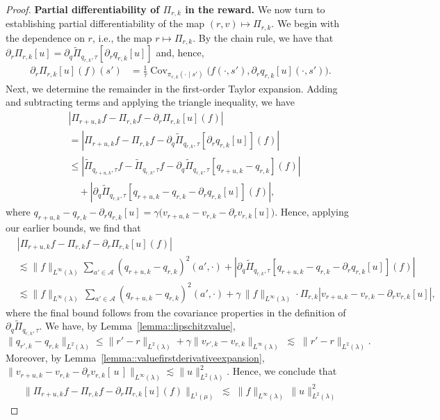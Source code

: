 \documentclass[11pt]{article}
\theoremstyle{plain}
\begin{document}
\begin{proof}
\noindent \textbf{Partial differentiability of $\Pi_{r,k}$ in the reward.} We now turn to establishing partial differentiability of the map $(r,v) \mapsto \Pi_{r,k}$. We begin with the dependence on $r$, i.e., the map $r \mapsto \Pi_{r,k}$. By the chain rule, we have that $\partial_r \Pi_{r, k}[u] =  \partial_q \widetilde{\Pi}_{q_{r,k},\tau}[\partial_r q_{r,k}[u]]$ and, hence,
\begin{align*}
    \partial_r \Pi_{r, k}[u](f)(s') &=  \frac{1}{\tau}\operatorname{Cov}_{\pi_{r, k}(\cdot \mid s')}\big(f(\cdot, s'), \partial_r q_{r,k}[u](\cdot, s')\big) .
\end{align*} 
Next, we determine the remainder in the first-order Taylor expansion. Adding and subtracting terms and applying the triangle inequality, we have 
\begin{align*}
&\left| \Pi_{r + u, k} f - \Pi_{r, k} f - \partial_r \Pi_{r, k}[u](f) \right| \\
&= \left| \Pi_{r + u, k} f - \Pi_{r, k} f - \partial_q \widetilde{\Pi}_{q_{r,k},\tau}[\partial_r q_{r,k}[u]](f) \right| \\
&\leq \left| \widetilde{\Pi}_{q_{r + u, k},\tau} f - \widetilde{\Pi}_{q_{r,k},\tau} f - \partial_q \widetilde{\Pi}_{q_{r,k},\tau}[q_{r + u, k} - q_{r,k}] (f)\right| \\
&\quad + \left| \partial_q \widetilde{\Pi}_{q_{r,k},\tau}[q_{r + u, k} - q_{r,k} - \partial_r q_{r,k}[u]](f) \right|,
\end{align*}
where  $q_{r + u, k} - q_{r,k} - \partial_r q_{r,k}[u] 
= \gamma \big(v_{r + u, k} - v_{r,k} - \partial_r v_{r,k}[u]\big).$
Hence, applying our earlier bounds, we find that 
\begin{align*}
&\left| \Pi_{r + u, k} f - \Pi_{r, k} f - \partial_r \Pi_{r, k}[u](f) \right| \\
&\lesssim \|f\|_{L^\infty(\lambda)}  \sum_{a' \in \mathcal{A}} (q_{r + u, k} - q_{r,k})^2(a' , \cdot)
   + \left| \partial_q \widetilde{\Pi}_{q_{r,k},\tau}[q_{r + u, k} - q_{r,k} - \partial_r q_{r,k}[u]](f) \right| \\
&\lesssim \|f\|_{L^\infty(\lambda)} \,\sum_{a' \in \mathcal{A}} (q_{r + u, k} - q_{r,k})^2(a' , \cdot) 
   + \gamma\,\|f\|_{L^\infty(\lambda)} \cdot \Pi_{r,k}\left|v_{r + u, k} - v_{r,k} - \partial_r v_{r,k}[u] \right| ,
\end{align*}
where the final bound follows from the covariance properties in the definition of $\partial_q \widetilde{\Pi}_{q_{r,k},\tau}$. We have, by Lemma~\ref{lemma::lipschitzvalue}, 
\[
\|q_{r',k} - q_{r,k}\|_{L^2(\lambda)}  \leq   \|r' - r\|_{L^2(\lambda)}+ \gamma \|v_{r',k} - v_{r,k}\|_{L^\infty(\lambda)} \;\lesssim\; \|r' - r\|_{L^2(\lambda)}.
\]
Moreover, by Lemma~\ref{lemma::valuefirstderivativeexpansion},  $\big\|v_{r + u,k} - v_{r,k} - \partial_r v_{r,k}[\,u\,]\big\|_{L^\infty(\lambda)} \lesssim \|u\|_{L^2(\lambda)}^2.$ 
Hence, we conclude that 
\begin{align}
    \label{eqn::boundPi_reward}
    \| \Pi_{r + u, k} f - \Pi_{r, k} f - \partial_r \Pi_{r, k}[u](f) \|_{L^1(\mu)}
\;\lesssim\; \|f\|_{L^\infty(\lambda)} \,\|u\|_{L^2(\lambda)}^2
\end{align}
 


\end{proof}
\end{document}
